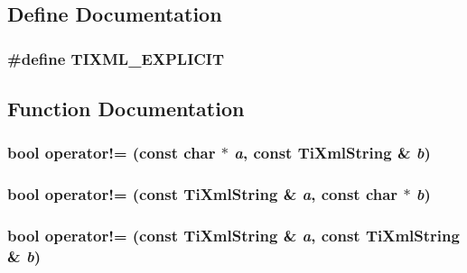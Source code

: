 \subsection{Define Documentation}
\subsubsection[TIXML\_\-EXPLICIT]{\setlength{\rightskip}{0pt plus 5cm}\#define TIXML\_\-EXPLICIT}\label{tinystr_8h_e341476cd6b94ee32e3e93110a759581}




\subsection{Function Documentation}
\subsubsection[operator"!=]{\setlength{\rightskip}{0pt plus 5cm}bool operator!= (const char $\ast$ {\em a}, \/  const {\bf TiXmlString} \& {\em b})\hspace{0.3cm}{\tt  [inline]}}\label{tinystr_8h_a37ff9329e975d8aae82ede2051ad8b8}


\subsubsection[operator"!=]{\setlength{\rightskip}{0pt plus 5cm}bool operator!= (const {\bf TiXmlString} \& {\em a}, \/  const char $\ast$ {\em b})\hspace{0.3cm}{\tt  [inline]}}\label{tinystr_8h_9deca021bf0c79c97b4b3c4a4579e3a4}


\subsubsection[operator"!=]{\setlength{\rightskip}{0pt plus 5cm}bool operator!= (const {\bf TiXmlString} \& {\em a}, \/  const {\bf TiXmlString} \& {\em b})\hspace{0.3cm}{\tt  [inline]}}\label{tinystr_8h_d56c73c4b133b623f29fdf9e5240296d}


